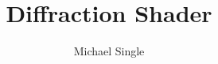 \documentclass[12pt]{article}
\begin{document}
\title{Diffraction Shader}
\author{Michael Single}
\maketitle

\newpage{\pagestyle{empty} \cleardoublepage}
\tableofcontents
\newpage{\pagestyle{empty} \cleardoublepage}


\newpage{\pagestyle{empty} \cleardoublepage}


\newpage{\pagestyle{empty} \cleardoublepage}


\newpage{\pagestyle{empty} \cleardoublepage}


\newpage{\pagestyle{empty} \cleardoublepage}


\newpage{\pagestyle{empty} \cleardoublepage}


\newpage{\pagestyle{empty} \cleardoublepage}
\end{document}
